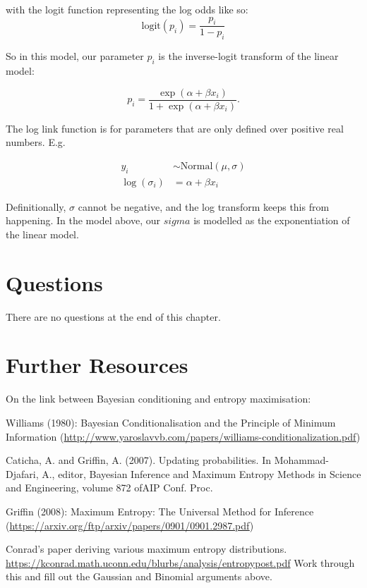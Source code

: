 \documentclass[
]{book}
\begin{document}
with the logit function representing the log odds like so:
\[
\text{logit}(p_i) = \frac{p_i}{1 - p_i}
\]

So in this model, our parameter \(p_i\) is the inverse-logit transform of the linear model:

\[
p_i = \frac{\exp(\alpha + \beta x_i)}{1 + \exp(\alpha + \beta x_i)}.
\]

The log link function is for parameters that are only defined over positive real numbers. E.g.

\[
\begin{aligned}
y_i &\sim \text{Normal}(\mu,\sigma) \\
\log(\sigma_i) &= \alpha + \beta x_i
\end{aligned}
\]

Definitionally, \(\sigma\) cannot be negative, and the log transform keeps this from happening. In the model above, our \(sigma\) is modelled as the exponentiation of the linear model.

\hypertarget{questions-9}{%
\section{Questions}\label{questions-9}}

There are no questions at the end of this chapter.

\hypertarget{further-resources}{%
\section*{Further Resources}\label{further-resources}}

On the link between Bayesian conditioning and entropy maximisation:

Williams (1980): Bayesian Conditionalisation and the Principle of Minimum Information (\url{http://www.yaroslavvb.com/papers/williams-conditionalization.pdf})

Caticha, A. and Griffin, A. (2007). Updating probabilities. In Mohammad-Djafari, A., editor, Bayesian Inference and Maximum Entropy Methods in Science and Engineering, volume 872 ofAIP Conf. Proc.

Griffin (2008): Maximum Entropy: The Universal Method for Inference (\url{https://arxiv.org/ftp/arxiv/papers/0901/0901.2987.pdf})

Conrad's paper deriving various maximum entropy distributions. \url{https://kconrad.math.uconn.edu/blurbs/analysis/entropypost.pdf}
Work through this and fill out the Gaussian and Binomial arguments above.
\end{document}
